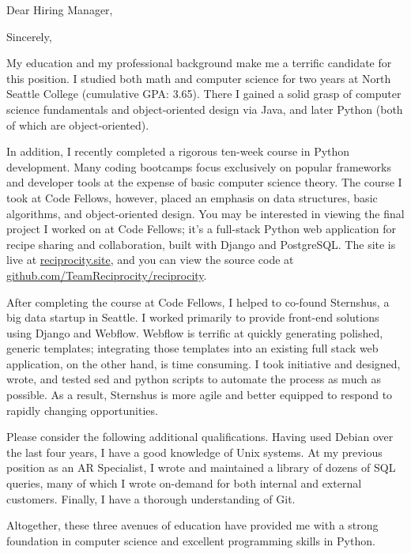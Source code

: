 \documentclass[10pt,a4paper,sans]{moderncv}        %
\begin{document}
\date{\today{}}
\opening{Dear Hiring Manager,}
\closing{Sincerely,}
\makelettertitle

My education and my professional background make me a terrific candidate for
this position. I studied both math and computer science for two years at North
Seattle College (cumulative GPA: 3.65). There I gained a solid grasp of computer
science fundamentals and object-oriented design via Java, and later Python (both
of which are object-oriented).

In addition, I recently completed a rigorous ten-week course in Python
development. Many coding bootcamps focus exclusively on popular frameworks and
developer tools at the expense of basic computer science theory. The course I
took at Code Fellows, however, placed an emphasis on data structures, basic
algorithms, and object-oriented design. You may be interested in viewing the
final project I worked on at Code Fellows; it's a full-stack Python web
application for recipe sharing and collaboration, built with Django and
PostgreSQL. The site is live at
{\href{http://reciprocity.site}{reciprocity.site}}, and you can view the source
code at
{\href{http://github.com/TeamReciprocity/reciprocity}{github.com/TeamReciprocity/reciprocity}}.

After completing the course at Code Fellows, I helped to co-found Sternshus, a
big data startup in Seattle. I worked primarily to provide front-end solutions
using Django and Webflow. Webflow is terrific at quickly generating polished,
generic templates; integrating those templates into an existing full stack web
application, on the other hand, is time consuming. I took initiative and
designed, wrote, and tested sed and python scripts to automate the process as
much as possible. As a result, Sternshus is more agile and better equipped to
respond to rapidly changing opportunities.

Please consider the following additional qualifications. Having used Debian over
the last four years, I have a good knowledge of Unix systems. At my previous
position as an AR Specialist, I wrote and maintained a library of dozens of SQL
queries, many of which I wrote on-demand for both internal and external
customers. Finally, I have a thorough understanding of Git.

Altogether, these three avenues of education have provided me with a strong
foundation in computer science and excellent programming skills in Python.
\end{document}
